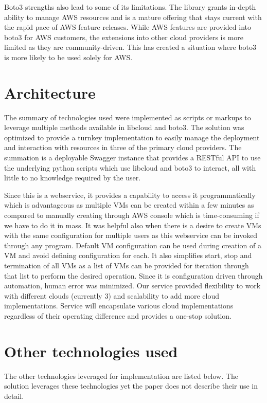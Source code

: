 Boto3 strengths also lead to some of its limitations. The library grants
in-depth ability to manage AWS resources and is a mature offering that stays
current with the rapid pace of AWS feature releases. While AWS features are
provided into boto3 for AWS customers, the extensions into other cloud providers
is more limited as they are community-driven. This has created a situation where
boto3 is more likely to be used solely for AWS.

\section{Architecture}

The summary of technologies used were implemented as scripts or markups to
leverage multiple methods available in libcloud and boto3. The solution was
optimized to provide a turnkey implementation to easily manage the deployment
and interaction with resources in three of the primary cloud providers. The
summation is a deployable Swagger instance that provides a RESTful API to use
the underlying python scripts which use libcloud and boto3 to interact, all with
little to no knowledge required by the user.

Since this is a webservice, it provides a capability to access it
programmatically which is advantageous as multiple VMs can be created within a
few minutes as compared to manually creating through AWS console which is
time-consuming if we have to do it in mass. It was helpful also when there is a
desire to create VMs with the same configuration for multiple users as this
webservice can be invoked through any program. Default VM configuration can be
used during creation of a VM and avoid defining configuration for each. It also
simplifies start, stop and termination of all VMs as a list of VMs can be
provided for iteration through that list to perform the desired operation. 
Since it is configuration driven through automation, human error was minimized.
Our service provided flexibility to work with different clouds (currently 3) and
scalability to add more cloud implementations. Service will encapsulate various
cloud implementations regardless of their operating difference and provides a
one-stop solution.

\section{Other technologies used}
The other technologies leveraged for implementation are listed below. The
solution leverages these technologies yet the paper does not describe their
use in detail.

